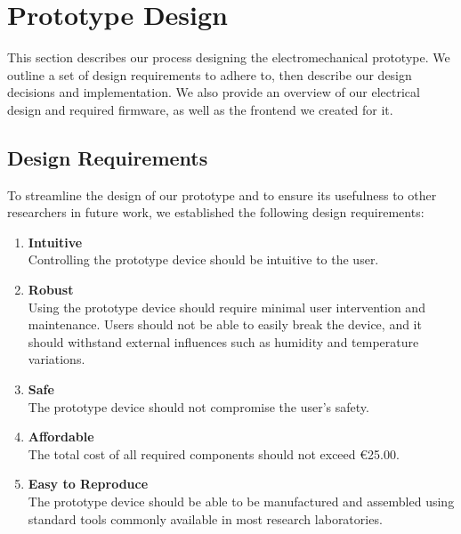 \section{Prototype Design}\label{sec:prototype_design}

This section describes our process designing the electromechanical prototype.
We outline a set of design requirements to adhere to, then describe our design decisions and implementation. We also provide an overview of our electrical design and required firmware, as well as the frontend we created for it.

\subsection{Design Requirements}

To streamline the design of our prototype and to ensure its usefulness to other researchers in future work, we established the following design requirements:

\begin{enumerate}[label=\textsf{DRQ\arabic*}, left=1em .. 4.5em]
    \item \textbf{Intuitive}\label{drq:intuitive}\\
        Controlling the prototype device should be intuitive to the user.

    \item \textbf{Robust}\label{drq:robust} \\
        Using the prototype device should require minimal user intervention and maintenance. Users should not be able to easily break the device, and it should withstand external influences such as humidity and temperature variations.

    \item \textbf{Safe}\label{drq:safe}\\
        The prototype device should not compromise the user's safety.

    \item \textbf{Affordable}\label{drq:affordable}\\
        The total cost of all required components should not exceed \euro25.00.

    \item \textbf{Easy to Reproduce}\label{drq:easy_to_reproduce}\\
        The prototype device should be able to be manufactured and assembled using standard tools commonly available in most research laboratories.
\end{enumerate}

